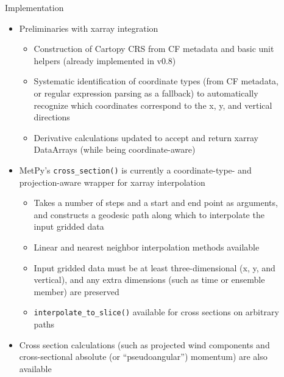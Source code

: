 \documentclass[final]{beamer}
\newlength{\sepwidth}
\newlength{\colwidth}
\newcommand{\separatorcolumn}{\begin{column}{\sepwidth}\end{column}}
\begin{document}
\begin{frame}[t, fragile]
\begin{columns}[t]
\begin{column}{\colwidth}
\begin{exampleblock}
  \end{exampleblock}

\end{column}

\separatorcolumn

\begin{column}{\colwidth}

  \begin{block}{Implementation}

    \begin{itemize}
      \item Preliminaries with xarray integration
        \begin{itemize}
          \item Construction of Cartopy CRS from CF metadata and basic unit helpers (already implemented in v0.8)
          \item Systematic identification of coordinate types (from CF metadata, or regular expression parsing as a fallback) to automatically recognize which coordinates correspond to the x, y, and vertical directions
          \item Derivative calculations updated to accept and return xarray DataArrays (while being coordinate-aware)
        \end{itemize}
      \item MetPy's \texttt{cross_section()} is currently a coordinate-type- and projection-aware wrapper for xarray interpolation
        \begin{itemize}
          \item Takes a number of steps and a start and end point as arguments, and constructs a geodesic path along which to interpolate the input gridded data
          \item Linear and nearest neighbor interpolation methods available
          \item Input gridded data must be at least three-dimensional (x, y, and vertical), and any extra dimensions (such as time or ensemble member) are preserved
          \item \texttt{interpolate_to_slice()} available for cross sections on arbitrary paths
        \end{itemize}
      \item Cross section calculations (such as projected wind components and cross-sectional absolute (or ``pseudoangular'') momentum) are also available
    \end{itemize}

  \end{block}


\end{column}
\end{columns}
\end{frame}
\end{document}
